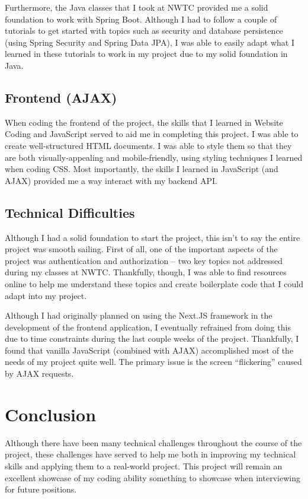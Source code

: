 \documentclass[letterpaper,11pt]{../../templates/texMemo}
\begin{document}
    Furthermore, the Java classes that I took at NWTC provided me a solid foundation to work with Spring Boot. Although I had to follow a couple of tutorials to get started with topics such as security and database persistence (using Spring Security and Spring Data JPA), I was able to easily adapt what I learned in these tutorials to work in my project due to my solid foundation in Java.

    \subsection{Frontend (AJAX)}
    When coding the frontend of the project, the skills that I learned in Website Coding and JavaScript served to aid me in completing this project. I was able to create well-structured HTML documents. I was able to style them so that they are both visually-appealing and mobile-friendly, using styling techniques I learned when coding CSS. Most importantly, the skills I learned in JavaScript (and AJAX) provided me a way interact with my backend API.

    \subsection{Technical Difficulties}
    Although I had a solid foundation to start the project, this isn't to say the entire project was smooth sailing. First of all, one of the important aspects of the project was authentication and authorization -- two key topics not addressed during my classes at NWTC. Thankfully, though, I was able to find resources online to help me understand these topics and create boilerplate code that I could adapt into my project.

    Although I had originally planned on using the Next.JS framework in the development of the frontend application, I eventually refrained from doing this due to time constraints during the last couple weeks of the project. Thankfully, I found that vanilla JavaScript (combined with AJAX) accomplished most of the needs of my project quite well. The primary issue is the screen ``flickering'' caused by AJAX requests.


    \section{Conclusion}
    Although there have been many technical challenges throughout the course of the project, these challenges have served to help me both in improving my technical skills and applying them to a real-world project. This project will remain an excellent showcase of my coding ability something to showcase when interviewing for future positions.

    \newpage

    \printbibliography
\end{document}
